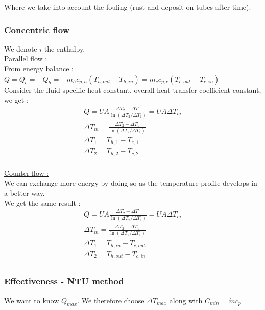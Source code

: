 \documentclass[../main.tex]{subfiles}
\begin{document}
Where we take into account the fouling (rust and deposit on tubes after time).\\

\subsubsection{Concentric flow}

We denote $i$ the enthalpy.\\

\quad \underline{Parallel flow :}\\

From energy balance : $Q = Q_c = -Q_h = -\dot{m}_h c_{p,h} (T_{h,out} - T_{h,in}) = \dot{m}_c c_{p,c} (T_{c,out} - T_{c,in})$\\

Consider the fluid specific heat constant, overall heat transfer coefficient constant, we get : \begin{equation}
\begin{gathered}
    Q = UA \frac{\Delta T_2 - \Delta T_1}{\ln(\Delta T_2 / \Delta T_1)} = UA \Delta T_m\\
    \Delta T_m = \frac{\Delta T_2 - \Delta T_1}{\ln(\Delta T_2 / \Delta T_1)}\\
    \Delta T_1 = T_{h,1} - T_{c,1}\\
    \Delta T_2 = T_{h,2} - T_{c,2}\\
    \end{gathered}
\end{equation}

\quad \underline{Counter flow :}\\

We can exchange more energy by doing so as the temperature profile develops in a better way.\\

We get the same result : 
 \begin{equation}
\begin{gathered}
    Q = UA \frac{\Delta T_2 - \Delta T_1}{\ln(\Delta T_2 / \Delta T_1)} = UA \Delta T_m\\
    \Delta T_m = \frac{\Delta T_2 - \Delta T_1}{\ln(\Delta T_2 / \Delta T_1)}\\
    \Delta T_1 = T_{h,in} - T_{c,out}\\
    \Delta T_2 = T_{h,out} - T_{c,in}\\
    \end{gathered}
\end{equation}

\subsubsection{Effectiveness - NTU method}
We want to know $Q_{max}$. We therefore choose $\Delta T_{max}$ along with $C_{min} = \dot{m} c_p$\\
\end{document}
